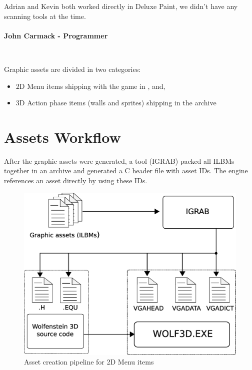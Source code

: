\documentclass[book.tex]{subfiles}
\begin{document}
\begin{fancyquotes}
Adrian and Kevin both worked directly in Deluxe Paint, we didn't have any scanning tools at the time.\\
\\
\textbf{John Carmack - Programmer}
\end{fancyquotes}\\
\par
Graphic assets are divided in two categories:
\begin{itemize}
\item 2D Menu items shipping with the game in ,  and, 
\item 3D Action phase items (walls and sprites) shipping in the  archive
\end{itemize}


\section{Assets Workflow}
After the graphic assets were generated, a tool (IGRAB) packed all ILBMs together in an archive and generated a C header file with asset IDs. The engine references an asset directly by using these IDs.\\
\begin{figure}[H]
\centering
 \includegraphics[width=.9\textwidth]{imgs/drawings/drawing_plain.eps}
 \caption{Asset creation pipeline for 2D Menu items}
 \label{asset-creation-pipeline}
\end{figure}
\par
\begin{minipage}{\textwidth}
 \par
 \end{minipage}
 
\end{document}
